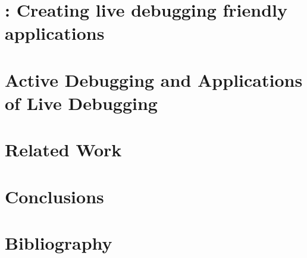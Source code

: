 \documentclass[11pt,openright,oneside,letterpaper,onecolumn]{report}  %
\begin{document}
\part{\iprobe: Creating live debugging friendly applications}


\part{Active Debugging and Applications of Live Debugging}


\part{Related Work}


\part{Conclusions}


%

\part{Bibliography}

 
\end{document}
